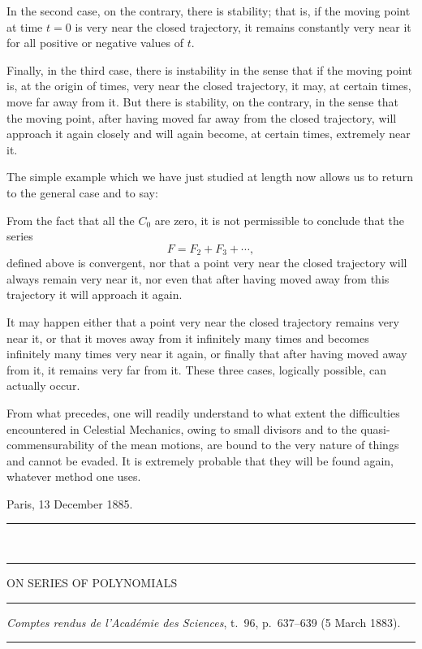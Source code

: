 \documentclass[11pt]{article}
\newcommand{\ornament}{\begin{center}\rule{2.5em}{0.4pt}\,\raisebox{0.1ex}{\tiny$\bullet\bullet\bullet$}\,\rule{2.5em}{0.4pt}\end{center}}
\newcommand{\shortline}{\begin{center}\rule{3.5em}{0.4pt}\end{center}}
\begin{document}
In the second case, on the contrary, there is stability; that is, if the moving point at time $t=0$ is very near the closed trajectory, it remains constantly very near it for all positive or negative values of $t$.

Finally, in the third case, there is instability in the sense that if the moving point is, at the origin of times, very near the closed trajectory, it may, at certain times, move far away from it. But there is stability, on the contrary, in the sense that the moving point, after having moved far away from the closed trajectory, will approach it again closely and will again become, at certain times, extremely near it.

The simple example which we have just studied at length now allows us to return to the general case and to say:

From the fact that all the $C_0$ are zero, it is not permissible to conclude that the series
\[
F=F_2+F_3+\cdots,
\]
defined above is convergent, nor that a point very near the closed trajectory will always remain very near it, nor even that after having moved away from this trajectory it will approach it again.

It may happen either that a point very near the closed trajectory remains very near it, or that it moves away from it infinitely many times and becomes infinitely many times very near it again, or finally that after having moved away from it, it remains very far from it. These three cases, logically possible, can actually occur.

From what precedes, one will readily understand to what extent the difficulties encountered in Celestial Mechanics, owing to small divisors and to the quasi-commensurability of the mean motions, are bound to the very nature of things and cannot be evaded. It is extremely probable that they will be found again, whatever method one uses.

\begin{flushleft}
Paris, 13 December 1885.
\end{flushleft}

\ornament

\clearpage
\begin{center}
{\Large ON SERIES OF POLYNOMIALS}
\end{center}
\shortline
\begin{center}
\emph{Comptes rendus de l'Académie des Sciences}, t.~96, p.~637--639 (5 March 1883).
\end{center}
\shortline
\end{document}

